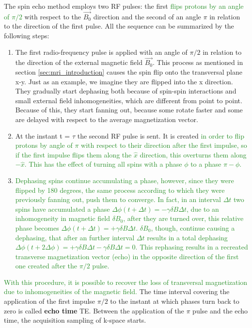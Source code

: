 \documentclass[11pt]{report}
\begin{document}
The spin echo method employs two RF pulses: the first \textcolor{ForestGreen}{flips protons by an angle of $\pi/2$} with respect to the $\vec{B_0}$ direction and the second of an angle $\pi$ in relation to the direction of the first pulse.
All the sequence can be summarized by the following steps:
\begin{enumerate}
\item The first radio-frequency pulse is applied with an angle of $\pi/2$ in relation to the direction of the external magnetic field $\overrightarrow{B_0}$. This process as mentioned in section \ref{sec:mri_introduction} causes the spin flip onto the transversal plane x-y.
Just as an example, we imagine they are flipped into the x direction. They gradually start dephasing both because of spin-spin interactions and small external field inhomogeneities, which are different from point to point.
Because of this, they start fanning out, because some rotate faster and some are delayed with respect to the average magnetization vector.

\item At the instant t = $\tau $ the second RF pulse is sent. It is created \textcolor{ForestGreen}{in order to flip protons by angle of $\pi$ with respect to their direction after the first impulse, so if the first impulse flips them along the $\hat x$ direction, this overturns them along $-\hat x$.
This has the effect of turning all spins with a phase $\phi$ to a phase $\pi - \phi$.}

\item \textcolor{ForestGreen}{Dephasing spins continue accumulating a phase, however, since they were flipped by 180 degrees, the same process according to which they were previously fanning out, push them to converge.
In fact, in an interval $\Delta t$ two spins have accumulated a phase
$\Delta \phi (t+\Delta t) = -\gamma \delta B \Delta t$,
due to an inhomogeneity in magnetic field $\delta B_0$, after they are turned over, this relative phase becomes
$\Delta \phi (t+\Delta t)= + \gamma \delta B \Delta t$. $\delta B_0$,
though, continue causing a dephasing, that after an further interval $\Delta t$ results in a total dephasing
$\Delta \phi (t+2 \Delta \phi) = + \gamma \delta B \Delta t - \gamma \delta B \Delta t = 0$.
This rephasing results in a recreated transverse magnetization vector (echo) in the opposite direction of the first one created after the $\pi/2$ pulse.
}
\end{enumerate}

\textcolor{ForestGreen}{
With this procedure, it is possible to recover the loss of transversal magnetization due to inhomogeneities of the magnetic field.
}
The time interval covering the application of the first impulse $\pi/2$ to the instant at which phases turn back to zero is called \textbf{echo time} TE.
Between the application of the $\pi$ pulse and the echo time, the acquisition sampling of k-space starts.
\end{document}
